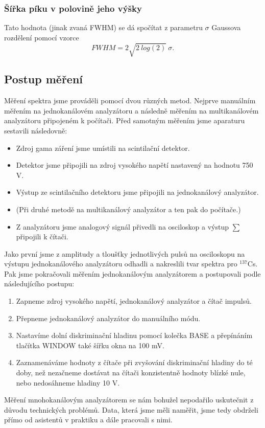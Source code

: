 \documentclass[english]{article}
\begin{document}
			\subsubsection{Šířka píku v polovině jeho výšky}
						Tato hodnota (jinak zvaná FWHM) se dá spočítat z parametru $\sigma$ Gaussova rozdělení pomocí vzorce
						\begin{equation}
								FWHM = 2 \sqrt{2\ log(2)}\ \sigma.
								\label{eq:fwhm}
						\end{equation}
			
	\subsection{Postup měření}
						Měření spektra jsme prováděli pomocí dvou různých metod. Nejprve manuálním měřením na jednokanálovém analyzátoru a následně měřením na multikanálovém analyzátoru připojeném k počítači. Před samotným měřením jsme aparaturu sestavili následovně:
						\begin{itemize}
								\item Zdroj gama záření jsme umístili na scintilační detektor.
								\item Detektor jsme připojili na zdroj vysokého napětí nastavený na hodnotu 750 V. 
								\item Výstup ze scintilačního detektoru jsme připojili na jednokanálový analyzátor.
								\item (Při druhé metodě na multikanálový analyzátor a ten pak do počítače.)
								\item Z analyzátoru jsme analogový signál přivedli na osciloskop a výstup $\sum$ připojili k čítači.
						\end{itemize}
						Jako první jsme z amplitudy a tloušťky jednotlivých pulsů na osciloskopu na výstupu jednokanálového analyzátoru odhadli a nakreslili tvar spektra pro $^{137}$Cs. Pak jsme pokračovali měřením jednokanálovým analyzátorem a postupovali podle následujícího postupu:
						\begin{enumerate}
								 \item Zapneme zdroj vysokého napětí, jednokanálový analyzátor a čítač impulsů.
								 \item Přepneme jednokanálový analyzátor do manuálního módu.
								 \item Nastavíme dolní diskriminační hladinu pomocí kolečka BASE a přepínáním tlačítka WINDOW také šířku okna na 100 mV. 
								 \item Zaznamenáváme hodnoty z čítače při zvyšování diskriminační hladiny do té doby, než nezačneme dostávat na čítači konzistentně hodnoty blízké nule, nebo nedosáhneme hladiny 10 V.
						\end{enumerate}
						Měření mnohokanálovým analyzátorem se nám bohužel nepodařilo uskutečnit z důvodu technických problémů. Data, která jsme měli naměřit, jsme tedy obdrželi přímo od asistentů v praktiku a dále pracovali s nimi. 
				
\end{document}
